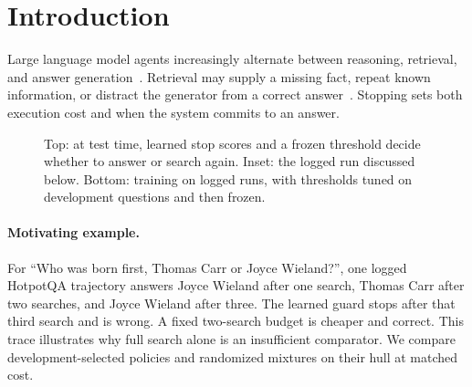 \section{Introduction}
\label{sec:intro}

Large language model agents increasingly alternate between reasoning,
retrieval, and answer generation~\cite{yao2023react,nakano2021webgpt,
trivedi2023ircot,jin2025searchr1}. Retrieval may supply a missing fact, repeat known information, or
distract the generator from a correct answer~\cite{chen2024overthinking,
cuadron2025danger,greshake2023notwhat}. Stopping sets both execution cost and when the system commits to an answer.

\begin{figure}[t]
  \centering
  
  \caption{Top: at test time, learned stop scores and a frozen threshold decide
  whether to answer or search again. Inset: the logged run discussed below.
  Bottom: training on logged runs, with thresholds tuned on development
  questions and then frozen.}
  \label{fig:overview}
\end{figure}

\paragraph{Motivating example.}
For ``Who was born first, Thomas Carr or Joyce Wieland?'', one logged HotpotQA
trajectory answers Joyce Wieland after one search, Thomas Carr after two searches,
and Joyce Wieland after three. The learned guard stops after that third search
and is wrong. A fixed two-search budget is cheaper and correct. This trace
illustrates why full search alone is an insufficient comparator. We compare
development-selected policies and randomized mixtures on their hull at matched
cost.

